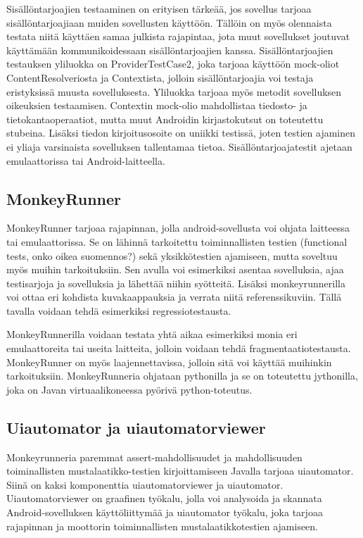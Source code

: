Sisällöntarjoajien testaaminen on erityisen tärkeää, jos sovellus tarjoaa sisällöntarjoajiaan muiden sovellusten käyttöön. Tällöin on myös olennaista testata niitä käyttäen samaa julkista rajapintaa, jota muut sovellukset joutuvat käyttämään kommunikoidessaan sisällöntarjoajien kanssa. Sisällöntarjoajien testauksen yliluokka on ProviderTestCase2, joka tarjoaa käyttöön mock-oliot ContentResolveriosta ja Contextista, jolloin sisällöntarjoajia voi testaja eristyksissä muusta sovelluksesta. Yliluokka tarjoaa myös metodit sovelluksen oikeuksien testaamisen. Contextin mock-olio mahdollistaa tiedosto- ja tietokantaoperaatiot, mutta muut Androidin kirjastokutsut on toteutettu stubeina. Lisäksi tiedon kirjoitusosoite on uniikki testissä, joten testien ajaminen ei yliaja varsinaista sovelluksen tallentamaa tietoa. Sisällöntarjoajatestit ajetaan emulaattorissa tai Android-laitteella. \cite{android}

\subsection{MonkeyRunner}
\label{monkeyrunner}

MonkeyRunner tarjoaa rajapinnan, jolla android-sovellusta voi ohjata laitteessa tai emulaattorissa. Se on lähinnä tarkoitettu toiminnallisten testien (functional tests, onko oikea suomennos?) sekä yksikkötestien ajamiseen, mutta soveltuu myös muihin tarkoituksiin. Sen avulla voi esimerkiksi asentaa sovelluksia, ajaa testisarjoja ja sovelluksia ja lähettää niihin syötteitä. Lisäksi monkeyrunnerilla voi ottaa eri kohdista kuvakaappauksia ja verrata niitä referenssikuviin. Tällä tavalla voidaan tehdä esimerkiksi regressiotestausta.

MonkeyRunnerilla voidaan testata yhtä aikaa esimerkiksi monia eri emulaattoreita tai useita laitteita, jolloin voidaan tehdä fragmentaatiotestausta. MonkeyRunner on myös laajennettavissa, jolloin sitä voi käyttää muihinkin tarkoituksiin. MonkeyRunneria ohjataan pythonilla ja se on toteutettu jythonilla, joka on Javan virtuaalikoneessa pyörivä python-toteutus.\cite{android}

\subsection{Uiautomator ja uiautomatorviewer}

Monkeyrunneria paremmat assert-mahdollisuudet ja mahdollisuuden toiminallisten mustalaatikko-testien kirjoittamiseen Javalla tarjoaa uiautomator. Siinä on kaksi komponenttia uiautomatorviewer ja uiautomator. Uiautomatorviewer on graafinen työkalu, jolla voi analysoida ja skannata Android-sovelluksen käyttöliittymää ja uiautomator työkalu, joka tarjoaa rajapinnan ja moottorin toiminnallisten mustalaatikkotestien ajamiseen.

